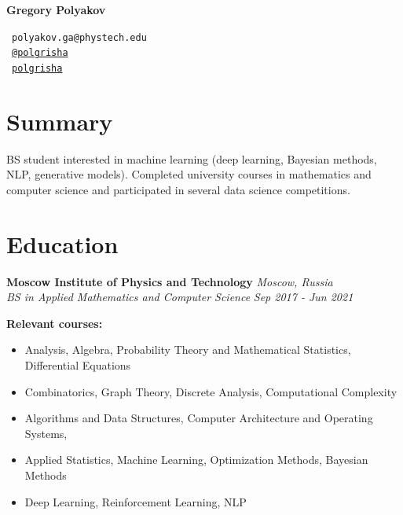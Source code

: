 \documentclass[letterpaper, 11pt]{article}
\begin{document}

\begin{center}
{\huge \sc \textbf{Gregory Polyakov}}
\end{center}

\vspace{10pt}

{\large \faEnvelopeO ~\texttt{polyakov.ga@phystech.edu} \\
\vspace{2pt}
{\color{capri} \faPaperPlaneO}~\href{https://t.me/polgrisha}{\texttt{@polgrisha}} \\
\vspace{2pt}
\faGithub ~\href{https://github.com/polgrisha}{\texttt{polgrisha}}} \\
    
\vspace{10pt}

\section{Summary}

BS student interested in machine learning (deep learning, Bayesian methods, NLP, generative models). Completed university courses in mathematics and computer science and participated in several data science  competitions.

\section{Education}

{\large \textbf{Moscow Institute of Physics and Technology}} \hfill \textsl{Moscow, Russia} \\
{\small \textsl{BS in Applied Mathematics and Computer Science}} \hfill \textsl{Sep 2017 - Jun 2021} \\

\vspace{4pt}

{\textbf{Relevant courses:}} \\
\begin{addmargin}[0em]{10em}
    \begin{itemize}
        \setlength\itemsep{-2pt}
        \item Analysis, Algebra, Probability Theory and Mathematical Statistics, Differential Equations
        \item Combinatorics, Graph Theory, Discrete Analysis, Computational Complexity 
        \item Algorithms and Data Structures, Computer Architecture and Operating Systems, 
        \item Applied Statistics, Machine Learning, Optimization Methods, Bayesian Methods
        \item Deep Learning, Reinforcement Learning, NLP
    \end{itemize}{}
\end{addmargin}
\end{document}
